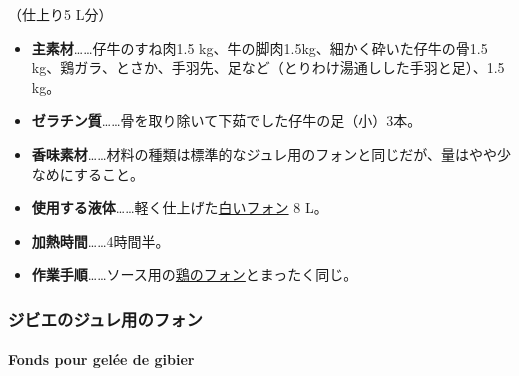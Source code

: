 \begin{recette}

（仕上り5 L分）

\begin{itemize}
\item
  \textbf{主素材}\ldots{}\ldots{}仔牛のすね肉1.5
  kg、牛の脚肉1.5kg、細かく砕いた仔牛の骨1.5
  kg、鶏ガラ、とさか、手羽先、足など（とりわけ湯通しした手羽と足）、1.5
  kg。
\item
  \textbf{ゼラチン質}\ldots{}\ldots{}骨を取り除いて下茹でした仔牛の足（小）3本。
\item
  \textbf{香味素材}\ldots{}\ldots{}材料の種類は標準的なジュレ用のフォンと同じだが、量はやや少なめにすること。
\item
  \textbf{使用する液体}\ldots{}\ldots{}軽く仕上げた\protect\hyperlink{fonds-blanc}{白いフォン}
  8 L。
\item
  \textbf{加熱時間}\ldots{}\ldots{}4時間半。
\item
  \textbf{作業手順}\ldots{}\ldots{}ソース用の\protect\hyperlink{fonds-de-volaille}{鶏のフォン}とまったく同じ。
\end{itemize}

\maeaki

\hypertarget{ux30b8ux30d3ux30a8ux306eux30b8ux30e5ux30ecux7528ux306eux30d5ux30a9ux30f3}{%
\subsubsection{ジビエのジュレ用のフォン}\label{ux30b8ux30d3ux30a8ux306eux30b8ux30e5ux30ecux7528ux306eux30d5ux30a9ux30f3}}

\hypertarget{fonds-pour-gelee-de-gibier}{%
\paragraph{Fonds pour gelée de
gibier}\label{fonds-pour-gelee-de-gibier}}



\end{recette}
